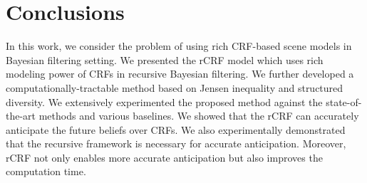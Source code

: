 \section{Conclusions}
In this work, we consider the problem of using rich \mbox{CRF-based} scene models in Bayesian filtering setting. We presented the rCRF model which uses rich modeling power of CRFs in recursive Bayesian filtering. We further developed a computationally-tractable method based on Jensen inequality and structured diversity. We extensively experimented the proposed method against the state-of-the-art methods and various baselines. We showed that the rCRF can accurately anticipate the future beliefs over CRFs. We also experimentally demonstrated that the recursive framework is necessary for accurate anticipation. Moreover, rCRF not only enables more accurate anticipation but also improves the computation time.
